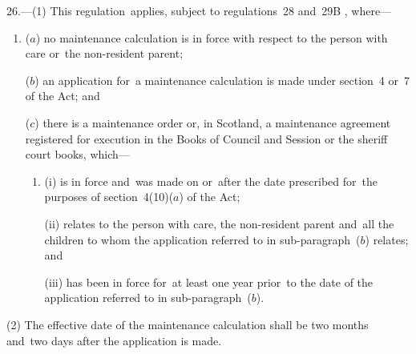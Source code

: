 \documentclass[12pt,a4paper]{article}
\begin{document}
26.---(1)  This regulation~applies, subject to 
regulations~28 and~29B%
, where—
\begin{enumerate}\item[]
($a$) no maintenance calculation is in force with respect to the person with care or~the non-resident parent;

($b$) an application for~a maintenance calculation is made under section~4 or~7 of the Act; and


($c$) there is a maintenance order 
or, in Scotland, a maintenance agreement registered for execution in the Books of Council and Session or the sheriff court books,  %
which—
\begin{enumerate}\item[]
(i) is in force and~was made on or~after the date prescribed for~the purposes of section~4(10)($a$)  of the Act;

(ii) relates to the person with care, the non-resident parent and~all the children to whom the application referred to in sub-\hspace{0pt}paragraph~($b$)  relates; and

(iii) has been in force for~at least one year prior~to the date of the application referred to in sub-paragraph~($b$).
\end{enumerate}
\end{enumerate}

(2) The effective date of the maintenance calculation shall be two months and~two days after the application is made.

\end{document}
